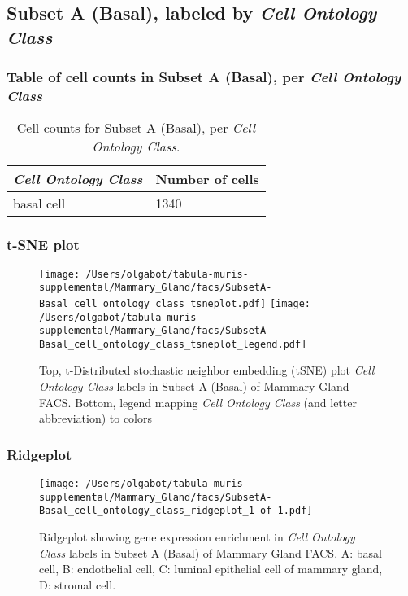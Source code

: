 \subsection{Subset A (Basal), labeled by \emph{Cell Ontology Class}}
\subsubsection{Table of cell counts in Subset A (Basal), per \emph{Cell Ontology Class}}\begin{table}[h]
\centering
\label{my-label}
\begin{tabular}{@{}ll@{}}
\toprule

\emph{Cell Ontology Class}& Number of cells \\ \midrule
basal cell & 1340 \\
\bottomrule
\end{tabular}
\caption{Cell counts for Subset A (Basal), per \emph{Cell Ontology Class}.}
\end{table}

\clearpage
\subsubsection{t-SNE plot}
\begin{figure}[h]
\centering
\texttt{[image: /Users/olgabot/tabula-muris-supplemental/Mammary\_Gland/facs/SubsetA-Basal\_cell\_ontology\_class\_tsneplot.pdf]}
\texttt{[image: /Users/olgabot/tabula-muris-supplemental/Mammary\_Gland/facs/SubsetA-Basal\_cell\_ontology\_class\_tsneplot\_legend.pdf]}
\caption{Top, t-Distributed stochastic neighbor embedding (tSNE) plot  \emph{Cell Ontology Class} labels in Subset A (Basal) of Mammary Gland FACS. Bottom, legend mapping \emph{Cell Ontology Class} (and letter abbreviation) to colors}
\end{figure}


\clearpage

\subsubsection{Ridgeplot}
\begin{figure}[h]
\centering
\texttt{[image: /Users/olgabot/tabula-muris-supplemental/Mammary\_Gland/facs/SubsetA-Basal\_cell\_ontology\_class\_ridgeplot\_1-of-1.pdf]}

\caption{ Ridgeplot  showing gene expression enrichment in \emph{Cell Ontology Class} labels in Subset A (Basal) of Mammary Gland FACS. A: basal cell, B: endothelial cell, C: luminal epithelial cell of mammary gland, D: stromal cell.}
\end{figure}


